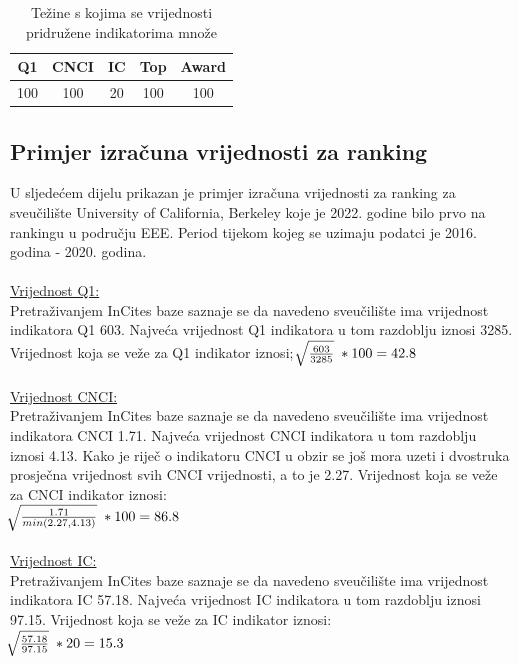 \documentclass[times, utf8, zavrsni]{fer}
\begin{document}
\begin{table}[htb]
    \caption{Težine s kojima se vrijednosti pridružene indikatorima množe}
        \label{tbl:konstante3}
        \centering
        \begin{tabular}{ccccc} \hline
        Q1 & CNCI & IC & Top & Award \\ \hline
        100&100&20&100&100\\
        \end{tabular}
        \end{table}    
        \FloatBarrier


\subsection{Primjer izračuna vrijednosti za ranking}
\label{racunanje}
U sljedećem dijelu prikazan je primjer izračuna vrijednosti za ranking za sveučilište University of California, Berkeley koje je 2022. godine bilo prvo na rankingu u području EEE.
Period tijekom kojeg se uzimaju podatci je 2016. godina - 2020. godina.
\\
\\ \underline{Vrijednost Q1:} 
\\ Pretraživanjem InCites baze saznaje se da navedeno sveučilište ima vrijednost indikatora Q1 603. Najveća vrijednost Q1 indikatora u tom razdoblju iznosi 3285.
Vrijednost koja se veže za Q1 indikator iznosi;  \; $\sqrt[\leftroot{-2}]{\frac{603}{3285}} \; * 100 = 42.8$
\\
\\ \underline{Vrijednost CNCI:} 
\\ Pretraživanjem InCites baze saznaje se da navedeno sveučilište ima vrijednost indikatora CNCI 1.71. Najveća vrijednost CNCI indikatora u tom razdoblju iznosi 4.13.
Kako je riječ o indikatoru CNCI u obzir se još mora uzeti i dvostruka prosječna vrijednost svih CNCI vrijednosti, a to je 2.27.
Vrijednost koja se veže za CNCI indikator iznosi: \; \\ $\sqrt[\leftroot{-2}]{\frac{1.71}{min(2.27, 4.13)}} \; * 100 = 86.8$
\\
\\ \underline{Vrijednost IC:} 
\\ Pretraživanjem InCites baze saznaje se da navedeno sveučilište ima vrijednost indikatora IC 57.18. Najveća vrijednost IC indikatora u tom razdoblju iznosi 97.15.
Vrijednost koja se veže za IC indikator iznosi: \; \\ $\sqrt[\leftroot{-2}]{\frac{57.18}{97.15}} \; * 20 = 15.3$
\end{document}
